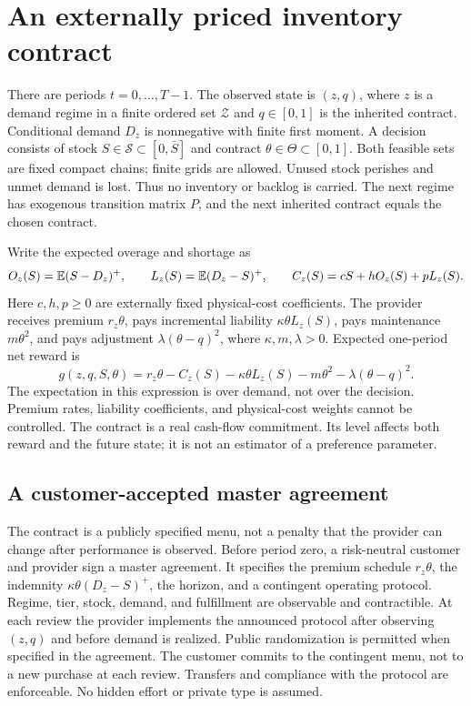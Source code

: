 \section{An externally priced inventory contract}\label{sec:model}
There are periods $t=0,\ldots,T-1$. The observed state is $(z,q)$, where $z$ is a demand regime in a finite ordered set $\mathcal Z$ and $q\in[0,1]$ is the inherited contract. Conditional demand $D_z$ is nonnegative with finite first moment. A decision consists of stock $S\in\mathcal S\subset[0,\bar S]$ and contract $\theta\in\Theta\subset[0,1]$. Both feasible sets are fixed compact chains; finite grids are allowed. Unused stock perishes and unmet demand is lost. Thus no inventory or backlog is carried. The next regime has exogenous transition matrix $P$, and the next inherited contract equals the chosen contract.

Write the expected overage and shortage as
\begin{equation}\label{eq:cost}
 O_z(S)=\mathbb E(S-D_z)^+,\qquad L_z(S)=\mathbb E(D_z-S)^+,\qquad
 C_z(S)=cS+hO_z(S)+pL_z(S).
\end{equation}
Here $c,h,p\geq0$ are externally fixed physical-cost coefficients. The provider receives premium $r_z\theta$, pays incremental liability $\kappa\theta L_z(S)$, pays maintenance $m\theta^2$, and pays adjustment $\lambda(\theta-q)^2$, where $\kappa,m,\lambda>0$. Expected one-period net reward is
\begin{equation}\label{eq:reward}
 g(z,q,S,\theta)=r_z\theta-C_z(S)-\kappa\theta L_z(S)
                       -m\theta^2-\lambda(\theta-q)^2.
\end{equation}
The expectation in this expression is over demand, not over the decision. Premium rates, liability coefficients, and physical-cost weights cannot be controlled. The contract is a real cash-flow commitment. Its level affects both reward and the future state; it is not an estimator of a preference parameter.

\subsection{A customer-accepted master agreement}\label{sec:institution}
The contract is a publicly specified menu, not a penalty that the provider can change after performance is observed. Before period zero, a risk-neutral customer and provider sign a master agreement. It specifies the premium schedule $r_z\theta$, the indemnity $\kappa\theta(D_z-S)^+$, the horizon, and a contingent operating protocol. Regime, tier, stock, demand, and fulfillment are observable and contractible. At each review the provider implements the announced protocol after observing $(z,q)$ and before demand is realized. Public randomization is permitted when specified in the agreement. The customer commits to the contingent menu, not to a new purchase at each review. Transfers and compliance with the protocol are enforceable. No hidden effort or private type is assumed.

